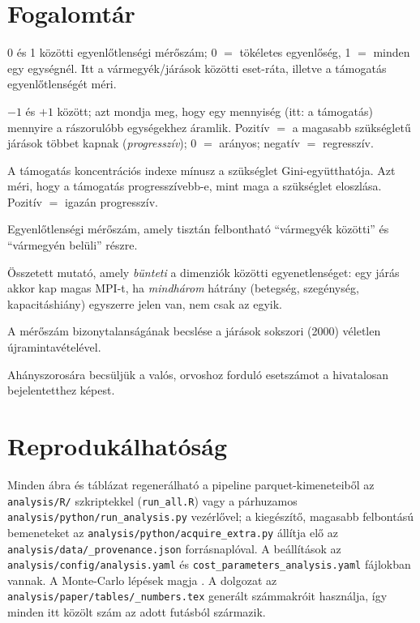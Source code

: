 \documentclass[12pt,a4paper]{article}
\begin{document}
\section{Fogalomt\'ar}
\begin{description}[leftmargin=0pt,style=nextline,nosep]
\item[Gini-együttható] 0 és 1 közötti egyenlőtlenségi mérőszám; 0 $=$ tökéletes
egyenlőség, 1 $=$ minden egy egységnél. Itt a vármegyék/járások közötti
eset-ráta, illetve a támogatás egyenlőtlenségét méri.
\item[Koncentrációs index] $-1$ és $+1$ között; azt mondja meg, hogy egy
mennyiség (itt: a támogatás) mennyire a rászorulóbb egységekhez áramlik.
Pozitív $=$ a magasabb szükségletű járások többet kapnak (\emph{progresszív});
0 $=$ arányos; negatív $=$ regresszív.
\item[Kakwani-index] A támogatás koncentrációs indexe mínusz a szükséglet
Gini-együtthatója. Azt méri, hogy a támogatás progresszívebb-e, mint maga a
szükséglet eloszlása. Pozitív $=$ igazán progresszív.
\item[Theil-index] Egyenlőtlenségi mérőszám, amely tisztán felbontható
\enquote{vármegyék közötti} és \enquote{vármegyén belüli} részre.
\item[Mazziotta--Pareto index (MPI)] Összetett mutató, amely \emph{bünteti}
a dimenziók közötti egyenetlenséget: egy járás akkor kap magas MPI-t, ha
\emph{mindhárom} hátrány (betegség, szegénység, kapacitáshiány) egyszerre
jelen van, nem csak az egyik.
\item[Bootstrap konfidenciaintervallum] A mérőszám bizonytalanságának
becslése a járások sokszori (2000) véletlen újramintavételével.
\item[Aluljelentési szorzó] Ahányszorosára becsüljük a valós, orvoshoz
forduló esetszámot a hivatalosan bejelentetthez képest.
\end{description}


\section{Reprodukálhatóság}
Minden ábra és táblázat regenerálható a pipeline parquet-kimeneteiből az
\texttt{analysis/R/} szkriptekkel (\texttt{run\_all.R}) vagy a párhuzamos
\texttt{analysis/python/run\_analysis.py} vezérlővel; a kiegészítő,
magasabb felbontású bemeneteket az \texttt{analysis/python/acquire\_extra.py}
állítja elő az \texttt{analysis/data/\_provenance.json} forrásnaplóval. A
beállítások az \texttt{analysis/config/analysis.yaml} és
\texttt{cost\_parameters\_analysis.yaml} fájlokban vannak. A Monte-Carlo
lépések magja \seed. A dolgozat az \texttt{analysis/paper/tables/\_numbers.tex}
generált számmakróit használja, így minden itt közölt szám az adott futásból
származik.
\end{document}
